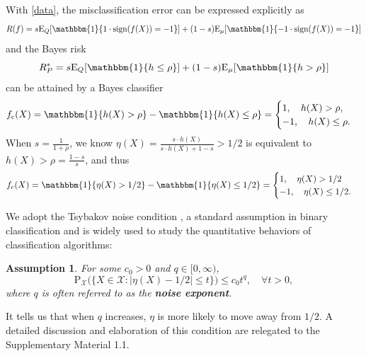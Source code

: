 \documentclass{article}
\newtheorem{assumption}{Assumption}
\begin{document}
With  \eqref{data}, the  misclassification error can be expressed  explicitly as
\begin{equation}
    R(f) = s\mathrm{E}_Q[\mathbbm{1}\{1 \cdot \text{sign}(f(X))=-1\}] + (1-s) \mathrm{E}_\mu[\mathbbm{1}\{-1 \cdot \text{sign}(f(X))=-1\}]
    \end{equation}
    and the Bayes risk 
    \begin{equation}
        R_P^* = s\mathrm{E}_Q[\mathbbm{1}\{h\leq\rho\}] + (1-s)\mathrm{E}_\mu[\mathbbm{1}\{h>\rho\}]
    \end{equation}
can be attained by a Bayes classifier
\begin{equation*}
    f_c (X)= \mathbbm{1}\{h(X)>\rho\} - \mathbbm{1}\{h(X)\leq\rho\} = \begin{cases}
1, \quad h(X)>\rho,\\
-1, \quad h(X)\leq\rho.
\end{cases}
\end{equation*}
When $s = \frac{1}{1+\rho}$, we know $\eta(X) = \frac{s\cdot h(X)}{s\cdot h(X)+1-s} > 1/2$ is equivalent to $h(X) > \rho = \frac{1-s}{s}$, and thus 
\begin{eqnarray*}
     f_c (X)
     = \mathbbm{1}\{\eta(X) > 1/2\} - \mathbbm{1}\{\eta(X) \leq 1/2\} = \begin{cases}
1, \quad \eta(X) > 1/2\\
-1, \quad \eta(X) \leq 1/2.
\end{cases}   
\end{eqnarray*}

We adopt the Tsybakov noise condition \citep{tsybakov2004optimal}, a standard assumption in binary classification and is widely used to study the quantitative behaviors of classification algorithms:
\begin{assumption}\label{Tsybakov}
  For some $c_0>0$ and $q\in [0, \infty)$, $$\mathrm{P}_{\mathcal{X}}\bigl(\{X\in \mathcal{X} : \left|\eta(X) -1/2\right| \leq t\}\bigr) \leq c_0t^q,\quad \forall t>0,$$ where $q$ is often referred to as the {\bf noise exponent}.  
\end{assumption}

 It tells us that when $q$ increases, $\eta$ is more likely to move away from $1/2$. A detailed discussion and elaboration of this condition are relegated to the Supplementary Material 1.1.
 
\end{document}

